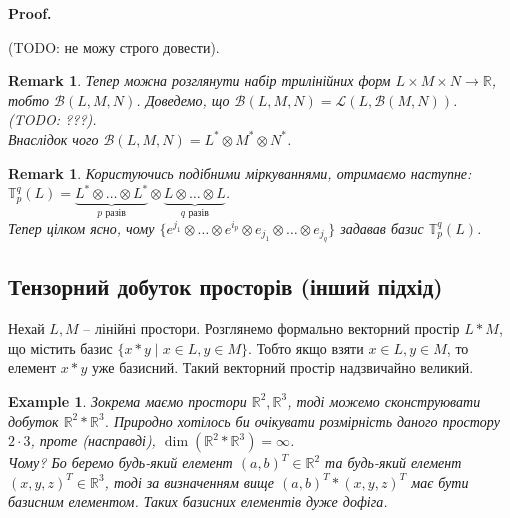 \documentclass[a4paper, 10pt]{article}
\makeatletter
\theoremstyle{theoremdd}
\newtheorem{example}[theorem]{Example}
\newtheorem{remark}[theorem]{Remark}
\renewenvironment{proof}[1][Proof.\\]{\par
\pushQED{\hfill \qed}%
\normalfont \topsep6\p@\@plus6\p@\relax
\trivlist
\item\relax
{\bfseries
#1\@addpunct{.}}\hspace\labelsep\ignorespaces
}{%
\popQED\endtrivlist\@endpefalse
}
\makeatother
\begin{document}
\begin{proof}
(TODO: не можу строго довести).
\end{proof}

\begin{remark}
Тепер можна розглянути набір трилінійних форм $L \times M \times N \to \mathbb{R}$, тобто $\mathcal{B}(L,M,N)$. Доведемо, що $\mathcal{B}(L,M,N) = \mathcal{L}(L, \mathcal{B}(M,N))$. (TODO: ???).\\
Внаслідок чого $\mathcal{B}(L,M,N) = L^* \otimes M^* \otimes N^*$.
\end{remark}

\begin{remark}
Користуючись подібними міркуваннями, отримаємо наступне:\\
$\mathbb{T}_p^q(L) = \underbrace{L^* \otimes \dots \otimes L^*}_{p \text{ разів}} \otimes \underbrace{L \otimes \dots \otimes L}_{q \text{ разів}}$.
\bigskip \\
Тепер цілком ясно, чому $\{ e^{j_1} \otimes \dots \otimes e^{i_p} \otimes e_{j_1} \otimes \dots \otimes e_{j_q}\}$ задавав базис $\mathbb{T}_p^q(L)$.
\end{remark}

\subsection{Тензорний добуток просторів (інший підхід)}
Нехай $L,M$ -- лінійні простори. Розглянемо формально векторний простір $L*M$, що містить базис $\{ x*y \mid x \in L, y \in M \}$. Тобто якщо взяти $x \in L, y \in M$, то елемент $x*y$ уже базисний. Такий векторний простір надзвичайно великий.

\begin{example}
Зокрема маємо простори $\mathbb{R}^2, \mathbb{R}^3$, тоді можемо сконструювати добуток $\mathbb{R}^2 * \mathbb{R}^3$. Природно хотілось би очікувати розмірність даного простору $2 \cdot 3$, проте (насправді), $\dim (\mathbb{R}^2 * \mathbb{R}^3) = \infty$.\\
Чому? Бо беремо будь-який елемент $(a,b)^T \in \mathbb{R}^2$ та будь-який елемент $(x,y,z)^T \in \mathbb{R}^3$, тоді за визначенням вище $(a,b)^T * (x,y,z)^T$ має бути базисним елементом. Таких базисних елементів дуже дофіга.
\end{example}
\end{document}
